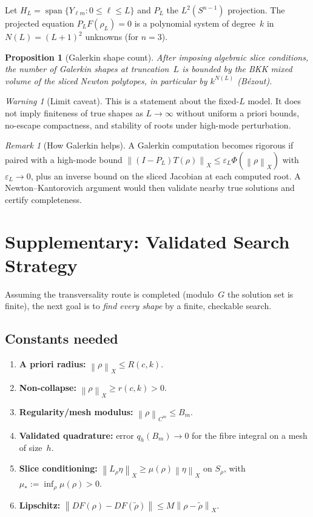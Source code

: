 \documentclass[12pt]{article}
\newtheorem{proposition}[theorem]{Proposition}
\theoremstyle{definition}
\theoremstyle{remark}
\newtheorem{remark}[theorem]{Remark}
\newtheorem{warning}[theorem]{Warning}
\newcommand{\norm}[1]{\left\|#1\right\|}
\begin{document}
Let $H_L=\operatorname{span}\{Y_{\ell m}:0\leq\ell\leq L\}$ and $P_L$ the
$L^2(S^{n-1})$ projection.  The projected equation $P_LF(\rho_L)=0$ is a
polynomial system of degree~$k$ in $N(L)=(L+1)^2$ unknowns (for $n=3$).

\begin{proposition}[Galerkin shape count]
  After imposing algebraic slice conditions, the number of Galerkin shapes
  at truncation~$L$ is bounded by the BKK mixed volume of the sliced
  Newton polytopes, in particular by $k^{N(L)}$ (B\'ezout).
\end{proposition}

\begin{warning}[Limit caveat]
  This is a statement about the fixed-$L$ model.  It does not imply
  finiteness of true shapes as $L\to\infty$ without uniform a priori bounds,
  no-escape compactness, and stability of roots under high-mode
  perturbation.
\end{warning}

\begin{remark}[How Galerkin helps]
  A Galerkin computation becomes rigorous if paired with a high-mode bound
  $\norm{(I-P_L)T(\rho)}_X\leq\varepsilon_L\Phi(\norm\rho_X)$ with
  $\varepsilon_L\to 0$, plus an inverse bound on the sliced Jacobian at each
  computed root.  A Newton--Kantorovich argument would then validate nearby
  true solutions and certify completeness.
\end{remark}

\section{Supplementary: Validated Search Strategy}
\label{sec:validated-search}

Assuming the transversality route is completed (modulo~$G$ the solution set
is finite), the next goal is to \emph{find every shape} by a finite,
checkable search.

\subsection{Constants needed}

\begin{enumerate}[leftmargin=2em]
  \item \textbf{A priori radius:} $\norm\rho_X\leq R(c,k)$.
  \item \textbf{Non-collapse:} $\norm\rho_X\geq r(c,k)>0$.
  \item \textbf{Regularity/mesh modulus:} $\norm\rho_{C^m}\leq B_m$.
  \item \textbf{Validated quadrature:} error $q_h(B_m)\to 0$ for the
    fibre integral on a mesh of size~$h$.
  \item \textbf{Slice conditioning:}
    $\norm{L_\rho\eta}_X\geq\mu(\rho)\norm\eta_X$ on $S_\rho$, with
    $\mu_*:=\inf_\rho\mu(\rho)>0$.
  \item \textbf{Lipschitz:}
    $\norm{DF(\rho)-DF(\tilde\rho)}\leq M\norm{\rho-\tilde\rho}_X$.
\end{enumerate}
\end{document}
